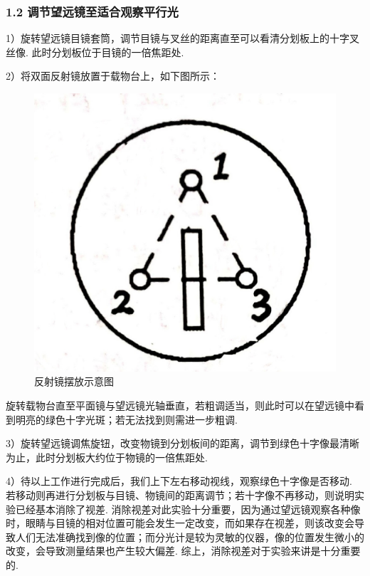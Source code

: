 \documentclass[UTF8]{ctexart}
\begin{document}
\subsubsection*{1.2 调节望远镜至适合观察平行光}
1）旋转望远镜目镜套筒，调节目镜与叉丝的距离直至可以看清分划板上的十字叉丝像. 此时分划板位于目镜的一倍焦距处.\par
2）将双面反射镜放置于载物台上，如下图所示：

\begin{figure}[H]\begin{center}
    \includegraphics[scale=0.2]{1.jpg}
    \caption{反射镜摆放示意图}
\end{center}\end{figure}

旋转载物台直至平面镜与望远镜光轴垂直，若粗调适当，则此时可以在望远镜中看到明亮的绿色十字光斑；若无法找到则需进一步粗调.\par
3）旋转望远镜调焦旋钮，改变物镜到分划板间的距离，调节到绿色十字像最清晰为止，此时分划板大约位于物镜的一倍焦距处.\par
4）待以上工作进行完成后，我们上下左右移动视线，观察绿色十字像是否移动. 若移动则再进行分划板与目镜、物镜间的距离调节；若十字像不再移动，则说明实验已经基本消除了视差. 消除视差对此实验十分重要，因为通过望远镜观察各种像时，眼睛与目镜的相对位置可能会发生一定改变，而如果存在视差，则该改变会导致人们无法准确找到像的位置；而分光计是较为灵敏的仪器，像的位置发生微小的改变，会导致测量结果也产生较大偏差. 综上，消除视差对于实验来讲是十分重要的.
\end{document}
